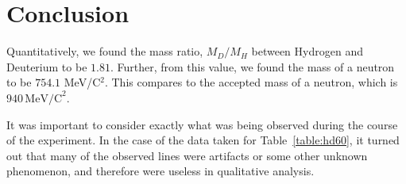 \documentclass[paper=a4, fontsize=11pt]{scrartcl} %
\numberwithin{equation}{section}
\numberwithin{figure}{section}
\numberwithin{table}{section}
\begin{document}














\section{Conclusion}

Quantitatively, we found the mass ratio, $M_D/M_H$ between Hydrogen and Deuterium to be $1.81$. Further, from this value, we found the mass of a neutron to be $754.1$ MeV/C$^2$. This compares to the accepted mass of a neutron, which is $940 \, \mathrm{MeV/C}^2$.

It was important to consider exactly what was being observed during the course of the experiment. In the case of the data taken for Table~\ref{table:hd60}, it turned out that many of the observed lines were artifacts or some other unknown phenomenon, and therefore were useless in qualitative analysis.
\end{document}
